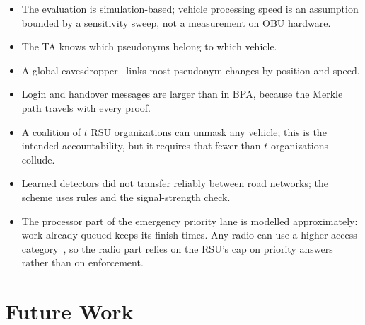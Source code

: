 \begin{itemize}
  \item The evaluation is simulation-based; vehicle processing speed is an assumption bounded by a
  sensitivity sweep, not a measurement on OBU hardware.
  \item The TA knows which pseudonyms belong to which vehicle.
  \item A global eavesdropper~\cite{gruteser2005tracking} links most pseudonym changes by position and speed.
  \item Login and handover messages are larger than in BPA, because the Merkle path travels with
  every proof.
  \item A coalition of $t$ RSU organizations can unmask any vehicle; this is the intended
  accountability, but it requires that fewer than $t$ organizations collude.
  \item Learned detectors did not transfer reliably between road networks; the scheme uses rules
  and the signal-strength check.
  \item The processor part of the emergency priority lane is modelled approximately: work already
  queued keeps its finish times. Any radio can use a higher access category~\cite{kenney2011dsrc}, so the radio part
  relies on the RSU's cap on priority answers rather than on enforcement.
\end{itemize}

\section{Future Work}

